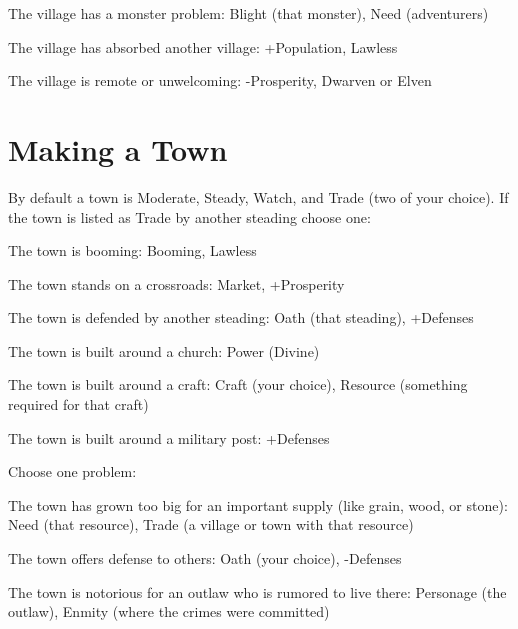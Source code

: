  
\item The village has a monster problem: Blight (that monster), Need (adventurers)

 
\item The village has absorbed another village: +Population, Lawless

 
\item The village is remote or unwelcoming: -Prosperity, Dwarven or Elven


\stopitemize
 
\section{Making a Town}   
 

By default a town is Moderate, Steady, Watch, and Trade (two of your choice). If the town is listed as Trade by another steading choose one:

 
\startitemize[1,packed]

\item The town is booming: Booming, Lawless

 
\item The town stands on a crossroads: Market, +Prosperity

 
\item The town is defended by another steading: Oath (that steading), +Defenses

 
\item The town is built around a church: Power (Divine)

 
\item The town is built around a craft: Craft (your choice), Resource (something required for that craft)

 
\item The town is built around a military post: +Defenses


\stopitemize
 

Choose one problem:

 
\startitemize[1,packed]

\item The town has grown too big for an important supply (like grain, wood, or stone): Need (that resource), Trade (a village or town with that resource)

 
\item The town offers defense to others: Oath (your choice), -Defenses

 
\item The town is notorious for an outlaw who is rumored to live there: Personage (the outlaw), Enmity (where the crimes were committed)

